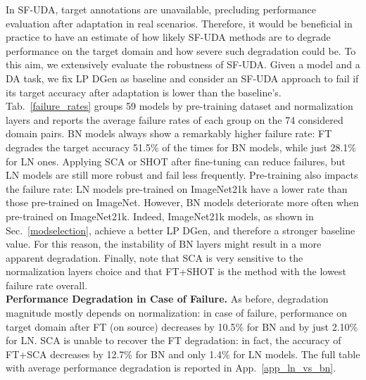 \documentclass{article}
\begin{document}
In SF-UDA, target annotations are unavailable, precluding performance evaluation after adaptation in real scenarios.
Therefore, it would be beneficial in practice to have an estimate of how likely SF-UDA methods are to degrade performance on the target domain 
and
how severe  such degradation could be.
To this aim, we 
extensively evaluate
the robustness of SF-UDA.
Given a model and a DA task, we fix 
LP DGen
as baseline
 and consider an SF-UDA approach to fail
if its 
target accuracy 
after adaptation
is lower than 
the baseline's. 
Tab.~\ref{failure_rates} groups 59 models 
by
pre-training dataset and normalization layers and reports the average failure rates 
of each group on the 74 considered domain pairs.
BN models always
show a remarkably higher 
failure rate: 
FT 
degrades the target accuracy 51.5\% of the times for BN models, while just 28.1\% for LN ones. 
Applying SCA or SHOT after fine-tuning can reduce failures, but  LN models are still more robust and fail less frequently.
Pre-training also impacts the failure rate: LN models pre-trained on ImageNet21k have a lower rate than those pre-trained on ImageNet.
However, BN models deteriorate more often when pre-trained on ImageNet21k. 
Indeed,
ImageNet21k models, as 
shown in Sec.~\ref{modselection}, achieve a better LP DGen, and  therefore a stronger baseline value.
For this reason, the instability of BN layers might result in a more apparent degradation. 
Finally, note that SCA is very sensitive to the normalization layers choice and that FT+SHOT is the method with the lowest  failure rate overall.\\
\textbf{Performance Degradation in Case of Failure.} As before, degradation magnitude mostly depends on normalization: in case of failure, performance on target domain after FT (on source) decreases by 10.5\% for BN and by just 2.10\% for LN. SCA is unable to recover the  FT degradation:  in fact, the accuracy of FT+SCA decreases by 12.7\% for BN and only  1.4\% for LN models.
The full table with average performance degradation is reported in App.~\ref{app_ln_vs_bn}.
\end{document}
